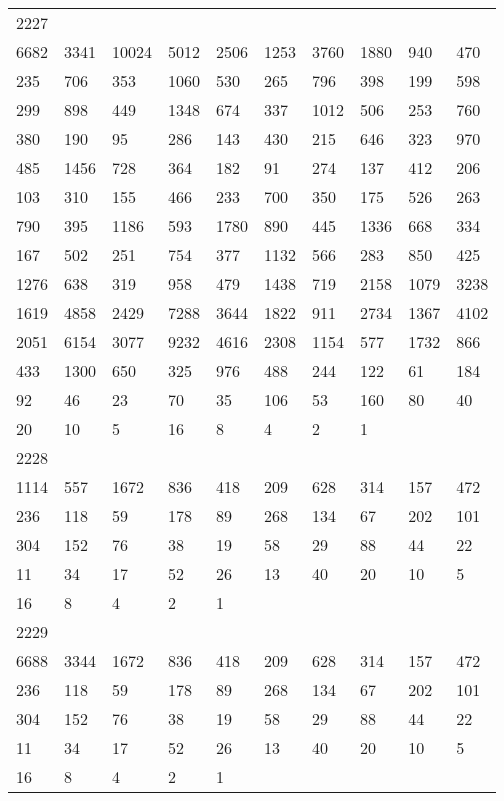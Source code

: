 \begin{longtable}{*{10}{l}}
2227&&&&&&&&&\\
6682& 3341& 10024& 5012& 2506& 1253& 3760& 1880& 940& 470\\
235& 706& 353& 1060& 530& 265& 796& 398& 199& 598\\
299& 898& 449& 1348& 674& 337& 1012& 506& 253& 760\\
380& 190& 95& 286& 143& 430& 215& 646& 323& 970\\
485& 1456& 728& 364& 182& 91& 274& 137& 412& 206\\
103& 310& 155& 466& 233& 700& 350& 175& 526& 263\\
790& 395& 1186& 593& 1780& 890& 445& 1336& 668& 334\\
167& 502& 251& 754& 377& 1132& 566& 283& 850& 425\\
1276& 638& 319& 958& 479& 1438& 719& 2158& 1079& 3238\\
1619& 4858& 2429& 7288& 3644& 1822& 911& 2734& 1367& 4102\\
2051& 6154& 3077& 9232& 4616& 2308& 1154& 577& 1732& 866\\
433& 1300& 650& 325& 976& 488& 244& 122& 61& 184\\
92& 46& 23& 70& 35& 106& 53& 160& 80& 40\\
20& 10& 5& 16& 8& 4& 2& 1& \\

2228&&&&&&&&&\\
1114& 557& 1672& 836& 418& 209& 628& 314& 157& 472\\
236& 118& 59& 178& 89& 268& 134& 67& 202& 101\\
304& 152& 76& 38& 19& 58& 29& 88& 44& 22\\
11& 34& 17& 52& 26& 13& 40& 20& 10& 5\\
16& 8& 4& 2& 1& \\

2229&&&&&&&&&\\
6688& 3344& 1672& 836& 418& 209& 628& 314& 157& 472\\
236& 118& 59& 178& 89& 268& 134& 67& 202& 101\\
304& 152& 76& 38& 19& 58& 29& 88& 44& 22\\
11& 34& 17& 52& 26& 13& 40& 20& 10& 5\\
16& 8& 4& 2& 1& \\


\end{longtable}

